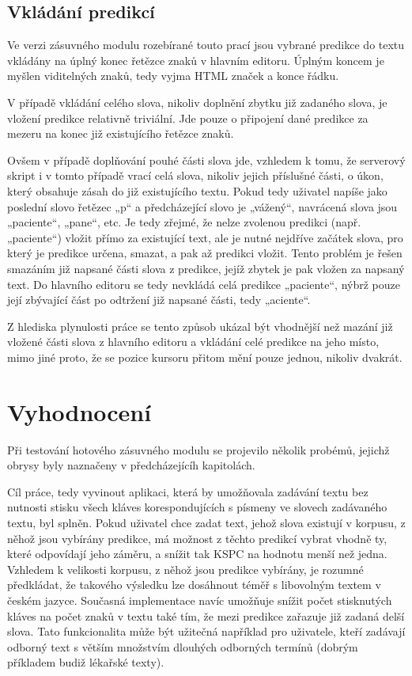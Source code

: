 \documentclass[a4paper,11pt]{article}
\begin{document}
\subsection{Vkládání predikcí}

Ve verzi zásuvného modulu rozebírané touto prací jsou vybrané predikce do textu vkládány na úplný konec řetězce znaků v hlavním editoru. Úplným koncem je myšlen viditelných znaků, tedy vyjma HTML značek a konce řádku.

V případě vkládání celého slova, nikoliv doplnění zbytku již zadaného slova, je vložení predikce relativně triviální. Jde pouze o připojení dané predikce za mezeru na konec již existujícího řetězce znaků. 

Ovšem v případě doplňování pouhé části slova jde, vzhledem k tomu, že serverový skript i v tomto případě vrací celá slova, nikoliv jejich příslušné části, o úkon, který obsahuje zásah do již existujícího textu. Pokud tedy uživatel napíše jako poslední slovo řetězec „p“ a předcházející slovo je „vážený“, navrácená slova jsou „paciente“, „pane“, etc. Je tedy zřejmé, že nelze zvolenou predikci (např. „paciente“) vložit přímo za existující text, ale je nutné nejdříve začátek slova, pro který je predikce určena, smazat, a pak až predikci vložit. Tento problém je řešen smazáním již napsané části slova z predikce, jejíž zbytek je pak vložen za napsaný text. Do hlavního editoru se tedy nevkládá celá predikce „paciente“, nýbrž pouze její zbývající část po odtržení již napsané části, tedy „aciente“.

Z hlediska plynulosti práce se tento způsob ukázal být vhodnější než mazání již vložené části slova z hlavního editoru a vkládání celé predikce na jeho místo, mimo jiné proto, že se pozice kursoru přitom mění pouze jednou, nikoliv dvakrát.

\section{Vyhodnocení}

Při testování hotového zásuvného modulu se projevilo několik probémů, jejichž obrysy byly naznačeny v předcházejícíh kapitolách. 


Cíl práce, tedy vyvinout aplikaci, která by umožňovala zadávání textu bez nutnosti stisku všech kláves korespondujících s písmeny ve slovech zadávaného textu, byl splněn. Pokud uživatel chce zadat text, jehož slova existují v korpusu, z něhož jsou vybírány predikce, má možnost z těchto predikcí vybrat vhodně ty, které odpovídají jeho záměru, a snížit tak KSPC na hodnotu menší než jedna. Vzhledem k velikosti korpusu, z něhož jsou predikce vybírány, je rozumné předkládat, že takového výsledku lze dosáhnout téměř s libovolným textem v českém jazyce. Současná implementace navíc umožňuje snížit počet stisknutých kláves na počet znaků v textu také tím, že mezi predikce zařazuje již zadaná delší slova. Tato funkcionalita může být užitečná například pro uživatele, kteří zadávají odborný text s větším množstvím dlouhých odborných termínů (dobrým příkladem budiž lékařské texty).
\end{document}
